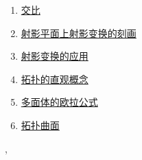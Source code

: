 \documentclass[11pt]{article}
\renewcommand{\today}{\shortmonthname[\the\month] \the \day,  \the\year}
\begin{document}
\begin{multicols}{2}
\begin{enumerate}
		\item \href{https://mp.weixin.qq.com/s/Sq2oYGbCSrVqMz4Vlh8JkQ}{交比}	%
		\item \href{https://mp.weixin.qq.com/s/FblyQMWxwPjBNwcjB2T6RA}{射影平面上射影变换的刻画}	%
		\item \href{https://mp.weixin.qq.com/s/4t2fWh9d40ybYH9mUiLKag}{射影变换的应用}	%
		\item \href{https://mp.weixin.qq.com/s/3X8B75TCqpWGQ-ezsryh9Q}{拓扑的直观概念}	%
		\item \href{https://mp.weixin.qq.com/s/y9Wp7sjf34ZauXdrNtX5ww}{多面体的欧拉公式}	%
		\item \href{https://mp.weixin.qq.com/s/956skwM3my-8HPkyMcHjOw}{拓扑曲面}	%
	\end{enumerate}
\end{multicols}



\vspace{0.5cm}

%
\begin{flushright}
	\tiny \today 
\end{flushright}
\end{document}
